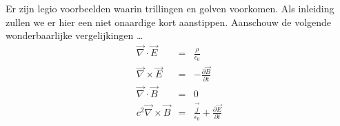 \documentclass{ximera}
\begin{document}
	\author{Bart Lambregs}



	Er zijn legio voorbeelden waarin trillingen en golven voorkomen. Als inleiding zullen we er hier een niet onaardige kort aanstippen. Aanschouw de volgende wonderbaarlijke vergelijkingen \ldots
	\begin{eqnarray*}
	\vec{\nabla}\cdot\vec{E}&=&\frac{\rho}{\epsilon_0}\\[3mm]
	\vec{\nabla}\times\vec{E}&=&-\frac{\partial\vec{B}}{\partial t}\\[3mm]
	\vec{\nabla}\cdot\vec{B}&=&0\\[3mm]
	c^2\vec{\nabla}\times\vec{B}&=&\frac{\vec{j}}{\epsilon_0}+\frac{\partial\vec{E}}{\partial t}\\
	\end{eqnarray*}
\end{document}
